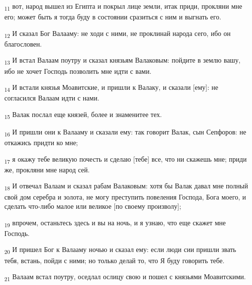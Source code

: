 \begin{tcolorbox}
\textsubscript{11} вот, народ вышел из Египта и покрыл лице земли, итак приди, прокляни мне его; может быть я тогда буду в состоянии сразиться с ним и выгнать его.
\end{tcolorbox}
\begin{tcolorbox}
\textsubscript{12} И сказал Бог Валааму: не ходи с ними, не проклинай народа сего, ибо он благословен.
\end{tcolorbox}
\begin{tcolorbox}
\textsubscript{13} И встал Валаам поутру и сказал князьям Валаковым: пойдите в землю вашу, ибо не хочет Господь позволить мне идти с вами.
\end{tcolorbox}
\begin{tcolorbox}
\textsubscript{14} И встали князья Моавитские, и пришли к Валаку, и сказали [ему]: не согласился Валаам идти с нами.
\end{tcolorbox}
\begin{tcolorbox}
\textsubscript{15} Валак послал еще князей, более и знаменитее тех.
\end{tcolorbox}
\begin{tcolorbox}
\textsubscript{16} И пришли они к Валааму и сказали ему: так говорит Валак, сын Сепфоров: не откажись придти ко мне;
\end{tcolorbox}
\begin{tcolorbox}
\textsubscript{17} я окажу тебе великую почесть и сделаю [тебе] все, что ни скажешь мне; приди же, прокляни мне народ сей.
\end{tcolorbox}
\begin{tcolorbox}
\textsubscript{18} И отвечал Валаам и сказал рабам Валаковым: хотя бы Валак давал мне полный свой дом серебра и золота, не могу преступить повеления Господа, Бога моего, и сделать что-либо малое или великое [по своему произволу];
\end{tcolorbox}
\begin{tcolorbox}
\textsubscript{19} впрочем, останьтесь здесь и вы на ночь, и я узнаю, что еще скажет мне Господь.
\end{tcolorbox}
\begin{tcolorbox}
\textsubscript{20} И пришел Бог к Валааму ночью и сказал ему: если люди сии пришли звать тебя, встань, пойди с ними; но только делай то, что Я буду говорить тебе.
\end{tcolorbox}
\begin{tcolorbox}
\textsubscript{21} Валаам встал поутру, оседлал ослицу свою и пошел с князьями Моавитскими.
\end{tcolorbox}
